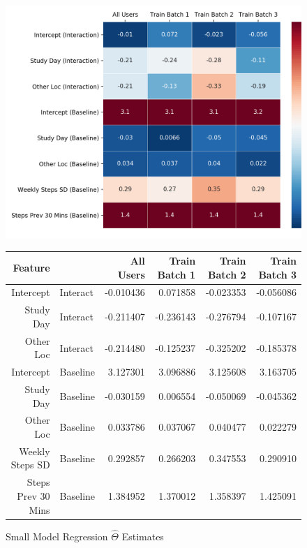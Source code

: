 \begin{figure}
\includegraphics[width=\textwidth]{figures/small_model_coefs_table.png}
\begin{tabular}{rl|rrrr}
\toprule
Feature & {} & All Users &  Train Batch 1 &  Train Batch 2 &  Train Batch 3 \\
\midrule
Intercept & Interact       &  -0.010436 &       0.071858 &      -0.023353 &      -0.056086 \\
Study Day & Interact       &  -0.211407 &      -0.236143 &      -0.276794 &      -0.107167 \\
Other Loc & Interact       &  -0.214480 &      -0.125237 &      -0.325202 &      -0.185378 \\
\hline
Intercept & Baseline          &   3.127301 &       3.096886 &       3.125608 &       3.163705 \\
Study Day & Baseline          &  -0.030159 &       0.006554 &      -0.050069 &      -0.045362 \\
Other Loc & Baseline          &   0.033786 &       0.037067 &       0.040477 &       0.022279 \\
Weekly Steps SD & Baseline    &   0.292857 &       0.266203 &       0.347553 &       0.290910 \\
Steps Prev 30 Mins & Baseline &   1.384952 &       1.370012 &       1.358397 &       1.425091 \\
\bottomrule
\end{tabular}


\caption{Small Model Regression $\hat{\Theta}$ Estimates}
\end{figure}


